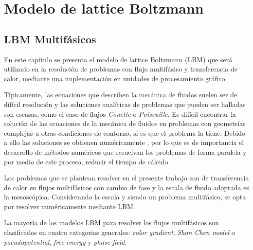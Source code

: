 \chapter{Modelo de lattice Boltzmann}

\graphicspath{{figs/cap2/}}
\label{cap2}

\section{LBM Multifásicos}

En este capítulo se presenta el modelo de lattice Boltzmann (LBM) que será utilizado en la resolución de problemas con flujo multifásico y transferencia de calor, mediante una implementación en unidades de procesamiento gráfico.

Típicamente, las ecuaciones que describen la mecánica de fluidos suelen ser de difícil resolución y las soluciones analíticas de problemas que pueden ser halladas son escasas, como el caso de flujos \textit{Couette} o \textit{Poiseuille}. Es difícil encontrar la solución de las ecuaciones de la mecánica de fluidos en problemas con geometrías complejas u otras condiciones de contorno, si es que el problema la tiene. Debido a ello las soluciones se obtienen numéricamente \cite{kruger2017lattice}, por lo que es de importancia el desarrollo de métodos numéricos que resuelvan los problemas de forma paralela y por medio de este proceso, reducir el tiempo de cálculo.

Los problemas que se plantean resolver en el presente trabajo son de transferencia de calor en flujos multifásicos con cambio de fase y la escala de fluido adoptada es la mesoscópica. Considerando la escala y siendo un problema multifásico, se opta por resolver numéricamente mediante LBM. 


La mayoría de los modelos LBM para resolver los flujos multifásicos son clasificados en cuatro categorias generales: \textit{color gradient}, \textit{Shan Chen model} o \textit{pseudopotential}, \textit{free-energy} y  \textit{phase-field}. 


